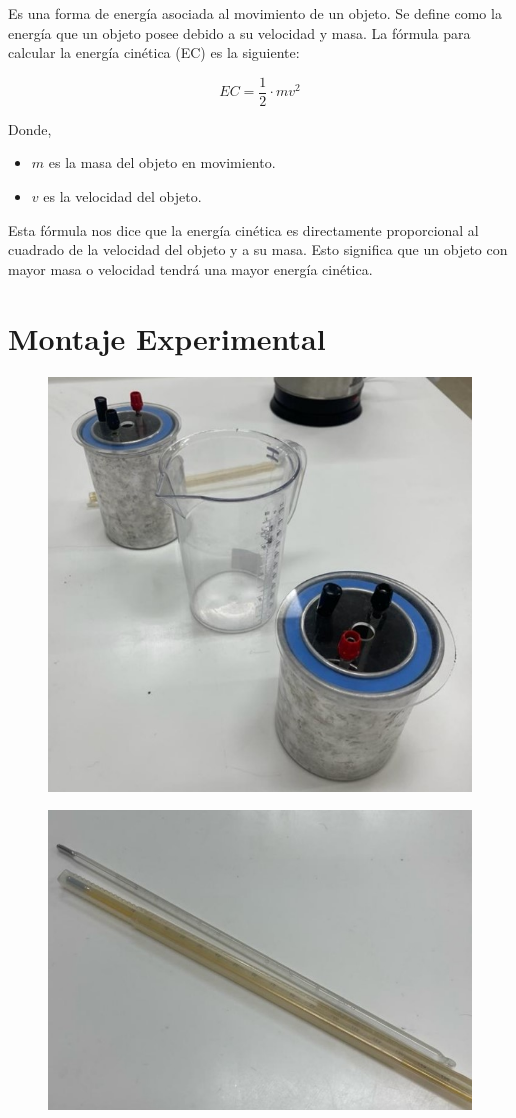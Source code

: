 \documentclass[letterpaper, 12pt]{article}
\begin{document}
Es una forma de energía asociada al movimiento de un
objeto. Se define como la energía que un objeto posee
debido a su velocidad y masa. La fórmula para calcular la
energía cinética (EC) es la siguiente:

\begin{equation*}
      EC = \frac{1}{2} \cdot m v^{2}
\end{equation*}

Donde,

\begin{itemize}
      \item $m$ es la masa del objeto en movimiento.
      \item $v$ es la velocidad del objeto.
\end{itemize}

Esta fórmula nos dice que la energía cinética es
directamente proporcional al cuadrado de la velocidad del
objeto y a su masa. Esto significa que un objeto con mayor
masa o velocidad tendrá una mayor energía cinética.

\section{Montaje Experimental}

\begin{figure}[H]
      \begin{center}
            \includegraphics[width=.5\linewidth]{./Images/Montaje1.jpg}
            \caption{}
      \end{center}
\end{figure}

\begin{figure}[H]
      \begin{center}
            \includegraphics[width=.5\linewidth]{./Images/Montaje2.jpg}
            \caption{}
      \end{center}
\end{figure}
\end{document}
